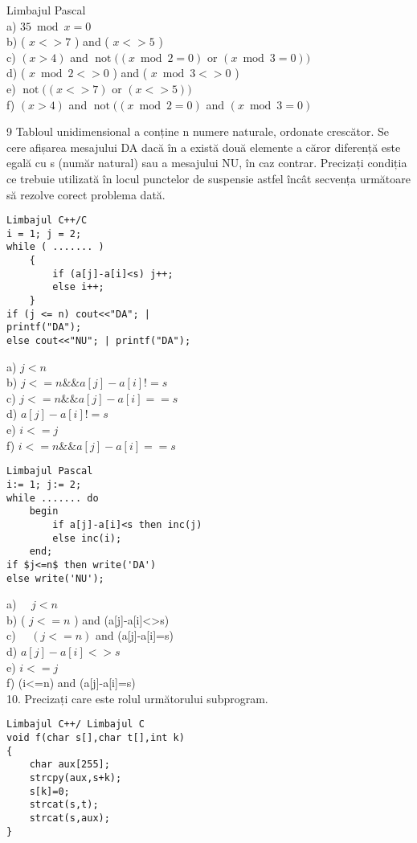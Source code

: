 Limbajul Pascal\\
a) $35 \bmod x=0$\\
b) ( $x<>7$ ) and ( $x<>5$ )\\
c) $(x>4)$ and $\operatorname{not}((x \bmod 2=0)$ or $(x \bmod 3=0))$\\
d) ( $x \bmod 2<>0$ ) and ( $x \bmod 3<>0$ )\\
e) $\operatorname{not}((x<>7)$ or $(x<>5))$\\
f) $(x>4)$ and $\operatorname{not}((x \bmod 2=0)$ and $(x \bmod 3=0)$

9 Tabloul unidimensional a conține n numere naturale, ordonate crescător. Se cere afișarea mesajului DA dacă în a există două elemente a căror diferență este egală cu s (număr natural) sau a mesajului NU, în caz contrar. Precizați condiția ce trebuie utilizată în locul punctelor de suspensie astfel încât secvența următoare să rezolve corect problema dată.

\begin{verbatim}
Limbajul C++/C
i = 1; j = 2;
while ( ....... )
    {
        if (a[j]-a[i]<s) j++;
        else i++;
    }
if (j <= n) cout<<"DA"; |
printf("DA");
else cout<<"NU"; | printf("DA");
\end{verbatim}

a) $j<n$\\
b) $j<=n \& \& a[j]-a[i]!=s$\\
c) $j<=n \& \& a[j]-a[i]==s$\\
d) $a[j]-a[i]!=s$\\
e) $i<=j$\\
f) $i<=n \& \& a[j]-a[i]==s$

\begin{verbatim}
Limbajul Pascal
i:= 1; j:= 2;
while ....... do
    begin
        if a[j]-a[i]<s then inc(j)
        else inc(i);
    end;
if $j<=n$ then write('DA')
else write('NU');
\end{verbatim}

a) $\quad j<n$\\
b) ( $j<=n$ ) and (a[j]-a[i]<>s)\\
c) $\quad(j<=n)$ and (a[j]-a[i]=s)\\
d) $a[j]-a[i]<>s$\\
e) $i<=j$\\[0pt]
f) (i<=n) and (a[j]-a[i]=s)\\
10. Precizați care este rolul următorului subprogram.

\begin{verbatim}
Limbajul C++/ Limbajul C
void f(char s[],char t[],int k)
{
    char aux[255];
    strcpy(aux,s+k);
    s[k]=0;
    strcat(s,t);
    strcat(s,aux);
}
\end{verbatim}

